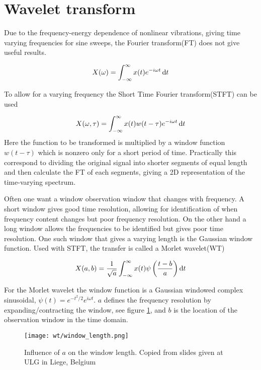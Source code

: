 
\section{Wavelet transform}
\label{sec:wavelet_transform}

Due to the frequency-energy dependence of nonlinear vibrations, giving time
varying frequencies for sine sweeps, the Fourier transform(FT) does not give
useful results.

\begin{equation}
    X(\omega) = \int_{-\infty}^\infty x(t) e^{-i\omega t} \operatorname{d}\! t
    \label{eq:ft_transform}
\end{equation}

To allow for a varying frequency the Short Time Fourier transform(STFT) can be
used

\begin{equation}
  X(\omega, \tau) = \int_{-\infty}^\infty x(t) w(t-\tau)  e^{-i\omega t} \operatorname{d}\! t
  \label{eq:sft_transform}
\end{equation}
Here the function to be transformed is multiplied by a window function
$w(t-\tau)$ which is nonzero only for a short period of time. Practically this
correspond to dividing the original signal into shorter segments of equal length
and then calculate the FT of each segments, giving a 2D representation of the
time-varying spectrum.

Often one want a window observation window that changes with frequency. A short
window gives good time resolution, allowing for identification of when frequency
content changes but poor frequency resolution. On the other hand a long window
allows the frequencies to be identified but gives poor time resolution. One such
window that gives a varying length is the Gaussian window function. Used with
STFT, the transfer is called a Morlet wavelet(WT)

\begin{equation}
  X(a, b) = \frac{1}{\sqrt{a}} \int_{-\infty}^\infty x(t) \psi\left(\frac{t-b}{a} \right) \operatorname{d}\! t
  \label{eq:mw_transform}
\end{equation}

For the Morlet wavelet the window function is a Gaussian windowed complex
sinusoidal, $\psi(t) = e^{-t^2/2}e^{i\omega t}$. $a$ defines the frequency
resolution by expanding/contracting the window, see figure
\ref{fig:mw_window_length}, and $b$ is the location of the observation window in
the time domain.

\begin{figure}[!ht]
  \centering
  \texttt{[image: wt/window\_length.png]}
  \caption{Influence of $a$ on the window length. Copied from slides given at
    ULG in Liege, Belgium}
  \label{fig:mw_window_length}
\end{figure}



